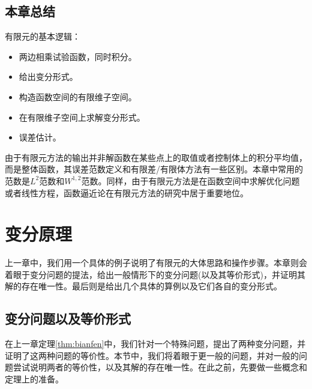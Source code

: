 \documentclass[lang=cn,10pt,newtx]{elegantbook}
\begin{document}
\section{本章总结}
有限元的基本逻辑：
\begin{itemize}
  \item 两边相乘试验函数，同时积分。
  \item 给出变分形式。
  \item 构造函数空间的有限维子空间。
  \item 在有限维子空间上求解变分形式。
  \item 误差估计。
\end{itemize}
由于有限元方法的输出并非解函数在某些点上的取值或者控制体上的积分平均值，而是整体函数，其误差范数定义和有限差/有限体方法有一些区别。本章中常用的范数是$L^{2}$范数和$W^{1,2}$范数。同样，由于有限元方法是在函数空间中求解优化问题或者线性方程，函数逼近论在有限元方法的研究中居于重要地位。
\chapter{变分原理}
上一章中，我们用一个具体的例子说明了有限元的大体思路和操作步骤。本章则会着眼于变分问题的提法，给出一般情形下的变分问题(以及其等价形式)，并证明其解的存在唯一性。最后则是给出几个具体的算例以及它们各自的变分形式。
\section{变分问题以及等价形式}
在上一章定理\ref{thm:bianfen}中，我们针对一个特殊问题，提出了两种变分问题，并证明了这两种问题的等价性。本节中，我们将着眼于更一般的问题，并对一般的问题尝试说明两者的等价性，以及其解的存在唯一性。在此之前，先要做一些概念和定理上的准备。
\end{document}
